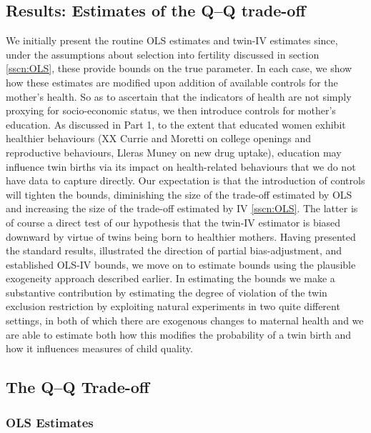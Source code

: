 \documentclass[subeqn]{article}
\begin{document}
\begin{spacing}{1.4}
\section{Results: Estimates of the Q--Q trade-off}
We initially present the routine OLS estimates and twin-IV estimates since, under the assumptions about selection into fertility discussed in section \ref{sscn:OLS}, these provide bounds on the true parameter. In each case, we show how these estimates are modified upon addition of available controls for the mother's health. So as to ascertain that the indicators of health are not simply proxying for socio-economic status, we then introduce controls for mother's education. As discussed in Part 1, to the extent that educated women exhibit healthier behaviours (XX Currie and Moretti on college openings and reproductive behaviours, Lleras Muney on new drug uptake), education may influence twin births via its impact on health-related behaviours that we do not have data to capture directly. Our expectation is that the introduction of controls will tighten the bounds, diminishing the size of the trade-off estimated by OLS and increasing the size of the trade-off estimated by IV \ref{sscn:OLS}. The latter is of course a direct test of our hypothesis that the twin-IV estimator is biased downward by virtue of twins being born to healthier mothers. Having presented the standard results, illustrated the direction of partial bias-adjustment, and established OLS-IV bounds, we move on to estimate bounds using the plausible exogeneity approach described earlier. In estimating the \citet{Conleyetal2012} bounds we make a substantive contribution by estimating the degree of violation of the twin exclusion restriction by exploiting natural experiments in two quite different settings, in both of which there are exogenous changes to maternal health and we are able to estimate both how this modifies the probability of a twin birth and how it influences measures of child quality.

\subsection{The Q--Q Trade-off} \label{TWINsscn:QQtwins}
\subsubsection{OLS Estimates} \label{TWINsscn:QQtwinsOLS}


\end{spacing}
\end{document}
